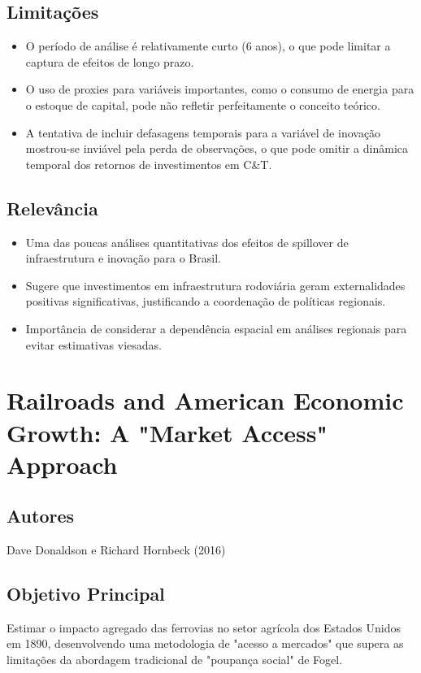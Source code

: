 \documentclass[12pt]{article}
\begin{document}
\subsection*{Limitações}
\begin{itemize}
    \item O período de análise é relativamente curto (6 anos), o que pode limitar a captura de efeitos de longo prazo.
    \item O uso de proxies para variáveis importantes, como o consumo de energia para o estoque de capital, pode não refletir perfeitamente o conceito teórico.
    \item A tentativa de incluir defasagens temporais para a variável de inovação mostrou-se inviável pela perda de observações, o que pode omitir a dinâmica temporal dos retornos de investimentos em C\&T.
\end{itemize}

\subsection*{Relevância}
\begin{itemize}
    \item Uma das poucas análises quantitativas dos efeitos de spillover de infraestrutura e inovação para o Brasil.
    \item Sugere que investimentos em infraestrutura rodoviária geram externalidades positivas significativas, justificando a coordenação de políticas regionais.
    \item Importância de considerar a dependência espacial em análises regionais para evitar estimativas viesadas.
\end{itemize}
\newpage

\section{Railroads and American Economic Growth: A "Market Access" Approach}

\subsection*{Autores}
Dave Donaldson e Richard Hornbeck (2016)

\subsection*{Objetivo Principal}
Estimar o impacto agregado das ferrovias no setor agrícola dos Estados Unidos em 1890, desenvolvendo uma metodologia de "acesso a mercados" que supera as limitações da abordagem tradicional de "poupança social" de Fogel.
\end{document}
